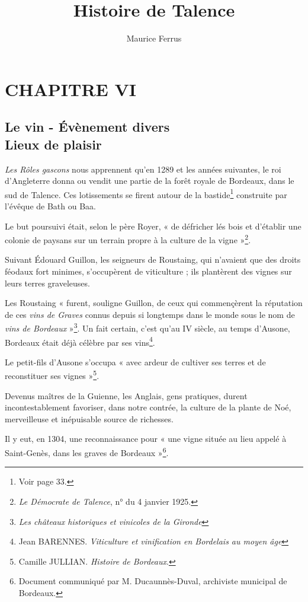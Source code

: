 \documentclass[a4paper,11pt]{book}
\begin{document}
\title{Histoire de Talence}
\author{Maurice Ferrus}
\frontmatter
\maketitle

\mainmatter{}

\chapter{CHAPITRE VI}
\section{Le vin - Évènement divers\\Lieux de plaisir}
\textit{Les Rôles gascons} nous apprennent qu'en 1289 et les années suivantes, le roi d'Angleterre donna ou vendit une partie de la forêt royale de Bordeaux, dans le sud de Talence. Ces lotissements se firent autour de la bastide\footnote{Voir page 33.} construite par l'évêque de Bath ou Baa.

Le but poursuivi était, selon le père Royer, « de défricher lés bois et d'établir une colonie de paysans sur un terrain propre à la culture de la vigne »\footnote{\textit{Le Démocrate de Talence}, n° du 4 janvier 1925.}.

Suivant Édouard Guillon, les seigneurs de Roustaing, qui n'avaient que des droits féodaux fort minimes, s'occupèrent de viticulture ; ils plantèrent des vignes sur leurs
terres graveleuses.

Les Roustaing « furent, souligne Guillon, de ceux qui commençèrent la réputation de ces \textit{vins de Graves} connus depuis si longtemps dans le monde sous le nom de \textit{vins de Bordeaux} »\footnote{\textit{Les châteaux historiques et vinicoles de la Gironde}}. Un fait certain, c'est qu'au IV\ieme{} siècle, au temps d'Ausone, Bordeaux était déjà célèbre par ses vins\footnote{Jean BARENNES. \textit{Viticulture et vinification en Bordelais au moyen âge}}.

Le petit-fils d'Ausone s'occupa « avec ardeur de cultiver
ses terres et de reconstituer ses vignes »\footnote{Camille JULLIAN. \textit{Histoire de Bordeaux}.}.

Devenus maîtres de la Guienne, les Anglais, gens pratiques, durent incontestablement favoriser, dans notre contrée, la culture de la plante de Noé, merveilleuse et inépuisable source de richesses.

Il y eut, en 1304, une reconnaissance pour « une vigne située au lieu appelé à Saint-Genès, dans les graves de Bordeaux »\footnote{Document communiqué par M. Ducaunnès-Duval, archiviste municipal de Bordeaux.}.
\end{document}
